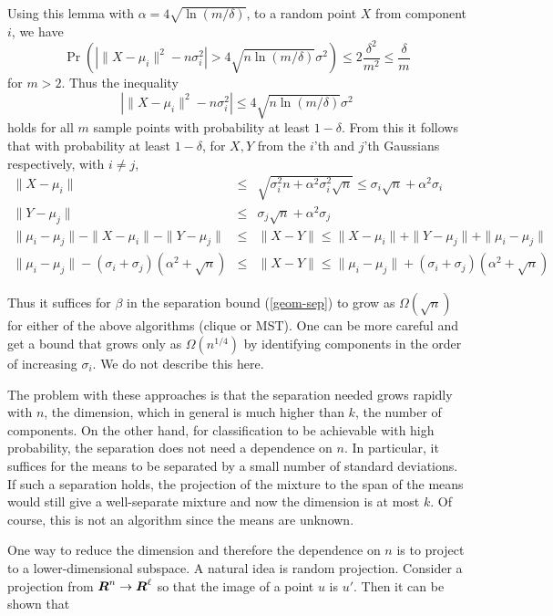 \documentclass{book}
\numberwithin{exercise}{chapter}
\begin{document}
Using this lemma with $\alpha = 4\sqrt{\ln (m/\delta)}$, to a random point $X$ from component $i$, we have
\[
\Pr(|\|X-\mu_i\|^2 - n\sigma_i^2| > 4\sqrt{n\ln (m/\delta)}\sigma^2)
\le 2\frac{\delta^2}{m^2} \le \frac{\delta}{m}
\]
for $m > 2$. Thus the inequality
\[
|\|X-\mu_i\|^2 - n\sigma_i^2| \le 4\sqrt{n\ln (m/\delta)}\sigma^2
\]
holds for all $m$ sample points with probability at least $1-\delta$.
From this it follows that with probability at least $1-\delta$, for $X,Y$ from the $i$'th and $j$'th Gaussians respectively,
with $i\not= j$,
\begin{eqnarray*}
\|X-\mu_i\|&\leq& \sqrt{ \sigma_i^2n+\alpha^2\sigma_i^2\sqrt n} \leq \sigma_i\sqrt n+\alpha^2\sigma_i\\
\|Y-\mu_j\|&\leq& \sigma_j\sqrt n+\alpha^2\sigma_j \\
\|\mu_i-\mu_j\|-\|X-\mu_i\|-\|Y-\mu_j\|&\leq& \|X-Y\| \leq \|X-\mu_i\|+\|Y-\mu_j\|+\|\mu_i-\mu_j\|\\
\|\mu_i-\mu_j\|-(\sigma_i+\sigma_j)(\alpha^2+\sqrt n)&\leq& \|X-Y\|\leq \|\mu_i-\mu_j\|+
(\sigma_i+\sigma_j)(\alpha^2+\sqrt n)
\end{eqnarray*}


Thus it suffices for $\beta$ in the separation bound (\ref{geom-sep}) to grow
as $\Omega(\sqrt{n})$ for either of the above algorithms (clique or MST). One can be more careful and get a bound that grows only as $\Omega(n^{1/4})$ by identifying components in the order of increasing $\sigma_i$.
We do not describe this here.

The problem with these approaches is that the separation needed
grows rapidly with $n$, the dimension, which in general is much higher than
$k$, the number of components. On the other hand, for classification to be achievable with high probability, the separation does not need a dependence on $n$. In particular, it suffices for the means to be separated by a small number of standard deviations. If such a separation holds, the projection of the mixture to the span of the means
would still give a well-separate mixture and now the dimension is at most $k$. Of course, this is not an
algorithm since the means are unknown.

One way to reduce the dimension and therefore the dependence on $n$ is to project
to a lower-dimensional subspace. A natural idea is random
projection.  Consider a projection from $\mbox{\mbox{\boldmath $R$}}^n
\rightarrow \mbox{\mbox{\boldmath $R$}}^\ell$ so that the image of a point $u$ is $u'$.
Then it can be shown that
\end{document}
